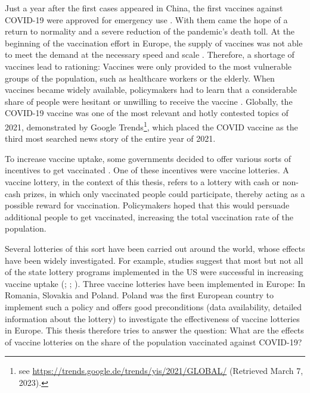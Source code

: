 \documentclass{scrbook}
\begin{document}
Just a year after the first cases appeared in China, the first vaccines
against COVID-19 were approved for emergency use
\parencite{us_food_and_drug_administration_fda_2020}. With them came the
hope of a return to normality and a severe reduction of the pandemic's
death toll. At the beginning of the vaccination effort in Europe, the
supply of vaccines was not able to meet the demand at the necessary
speed and scale \parencite{bongardt_europes_2021}. Therefore, a shortage
of vaccines lead to rationing: Vaccines were only provided to the most
vulnerable groups of the population, such as healthcare workers or the
elderly. When vaccines became widely available, policymakers had to
learn that a considerable share of people were hesitant or unwilling to
receive the vaccine \parencite{steinert_covid-19_2022}. Globally, the
COVID-19 vaccine was one of the most relevant and hotly contested topics
of 2021, demonstrated by Google
Trends\footnote{see \url{https://trends.google.de/trends/yis/2021/GLOBAL/} (Retrieved March 7, 2023).},
which placed the COVID vaccine as the third most searched news story of
the entire year of 2021.

To increase vaccine uptake, some governments decided to offer various
sorts of incentives to get vaccinated \parencite{wyllie_jewellery_2021}.
One of these incentives were vaccine lotteries. A vaccine lottery, in
the context of this thesis, refers to a lottery with cash or non-cash
prizes, in which only vaccinated people could participate, thereby
acting as a possible reward for vaccination. Policymakers hoped that
this would persuade additional people to get vaccinated, increasing the
total vaccination rate of the population.

Several lotteries of this sort have been carried out around the world,
whose effects have been widely investigated. For example, studies
suggest that most but not all of the state lottery programs implemented
in the US were successful in increasing vaccine uptake
(\cite{robertson_are_2021}; \cite{acharya_implementation_2021};
\cite{fuller_assessing_2022}). Three vaccine lotteries have been
implemented in Europe: In Romania, Slovakia and Poland. Poland was the
first European country to implement such a policy and offers good
preconditions (data availability, detailed information about the
lottery) to investigate the effectiveness of vaccine lotteries in
Europe. This thesis therefore tries to answer the question: What are the
effects of vaccine lotteries on the share of the population vaccinated
against COVID-19?
\end{document}

